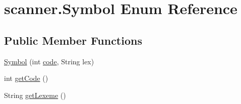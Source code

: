 \hypertarget{enumscanner_1_1Symbol}{}\section{scanner.\+Symbol Enum Reference}
\label{enumscanner_1_1Symbol}
\subsection*{Public Member Functions}
\begin{DoxyCompactItemize}
\item 
\hyperlink{enumscanner_1_1Symbol_a8ef20323663bc7edab38563a6d4a5318}{Symbol} (int \hyperlink{enumscanner_1_1Symbol_acf9fa625e4d4be91bcb93f6edef7d119}{code}, String lex)
\item 
int \hyperlink{enumscanner_1_1Symbol_ad0bfa41d4413bae1e046812633c59e6a}{get\+Code} ()
\item 
String \hyperlink{enumscanner_1_1Symbol_ae986ae2ce7a07522a8ea6a49beace3b2}{get\+Lexeme} ()
\end{DoxyCompactItemize}

